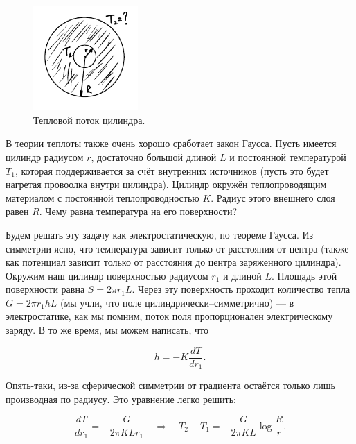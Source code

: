 \documentclass[11pt,a4paper]{article}
\numberwithin{equation}{section}
\begin{document}
\begin{figure}
  \vspace{-1.2cm}
  \begin{center}
    \includegraphics[width=4cm,height=4cm]{heat.pdf}
  \end{center}
  \vspace{-0.7cm}
  \caption{Тепловой поток цилиндра.}
  \label{fig:heat}
\end{figure}


В теории теплоты также очень хорошо сработает закон Гаусса. Пусть
имеется цилиндр радиусом $r$, достаточно большой длиной $L$ и
постоянной температурой $T_1$, которая поддерживается за счёт
внутренних источников (пусть это будет нагретая провоолка внутри
цилиндра). Цилиндр окружён теплопроводящим материалом с постоянной
теплопроводностью $K$. Радиус этого внешнего слоя равен $R$. Чему
равна температура на его поверхности?

Будем решать эту задачу как электростатическую, по теореме Гаусса. Из
симметрии ясно, что температура зависит только от расстояния от центра
(также как потенциал зависит только от расстояния до центра
заряженного цилиндра). Окружим наш цилиндр поверхностью радиусом $r_1$
и длиной $L$. Площадь этой поверхности равна $S = 2\pi r_1 L$. Через
эту поверхность проходит количество тепла $G = 2\pi r_1 h L$ (мы учли,
что поле цилиндрически--симметрично) --- в электростатике, как мы
помним, поток поля пропорционален электрическому заряду. В то же
время, мы можем написать, что

\begin{equation}
  \label{eq:heated_cylinder_1}
  h = -K \frac{dT}{dr_1}.
\end{equation}

Опять-таки, из-за сферической симметрии от градиента остаётся только
лишь производная по радиусу. Это уравнение легко решить: 

\begin{equation}
  \label{eq:heated_cylinder_2}
  \frac{dT}{dr_1} = -\frac{G}{2\pi K L r_1} \quad \Rightarrow \quad T_2 - T_1 =
  -\frac{G}{2\pi K L} \log \frac{R}{r}.
\end{equation}
\end{document}
